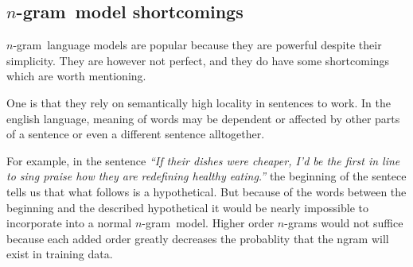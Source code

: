 \documentclass[a4paper,11pt]{kth-mag}
\newcommand{\ngram}{$n$-gram}
\begin{document}



\subsection{\ngram~model shortcomings}
\ngram~language models are popular because they are powerful despite their simplicity. They are however not
perfect, and they do have some shortcomings which are worth mentioning.

One is that they rely on semantically high locality in sentences to work. In the english language, meaning of words
may be dependent or affected by other parts of a sentence or even a different sentence alltogether.

For example, in the sentence \emph{``If their dishes were cheaper, I'd be the first in line to sing praise how they are redefining healthy eating.''} the beginning of the sentece tells us that what follows is a hypothetical. But because of the words between the beginning and the described hypothetical it would be nearly impossible to incorporate
into a normal \ngram~model. Higher order \ngram s would not suffice because each added order greatly decreases the probablity that the ngram will exist in training data.










\end{document}
